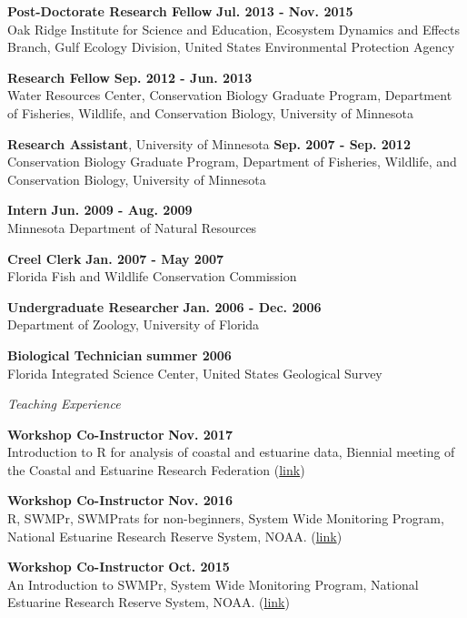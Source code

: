 \documentclass[letterpaper,12pt]{article}
\newcommand{\sectitle}[1]{\vspace{\baselineskip} \centerline{\large{\textit{#1}}}}
\begin{document}
{\bf Post-Doctorate Research Fellow} \hfill {\bf Jul. 2013 - Nov. 2015}\\
Oak Ridge Institute for Science and Education, Ecosystem Dynamics and Effects Branch, Gulf Ecology Division, United States Environmental Protection Agency

{\bf Research Fellow} \hfill {\bf Sep. 2012 - Jun. 2013} \\
Water Resources Center, Conservation Biology Graduate Program, Department of Fisheries, Wildlife, and Conservation Biology, University of Minnesota

{\bf Research Assistant}, University of Minnesota \hfill {\bf Sep. 2007 - Sep. 2012} \\
Conservation Biology Graduate Program, Department of Fisheries, Wildlife, and Conservation Biology, University of Minnesota

{\bf Intern} \hfill {\bf Jun. 2009 - Aug. 2009} \\
Minnesota Department of Natural Resources

{\bf Creel Clerk} \hfill {\bf Jan. 2007 - May 2007} \\
Florida Fish and Wildlife Conservation Commission

{\bf Undergraduate Researcher} \hfill {\bf Jan. 2006 - Dec. 2006} \\
Department of Zoology, University of Florida

{\bf Biological Technician} \hfill {\bf summer 2006} \\
Florida Integrated Science Center, United States Geological Survey

\sectitle{Teaching Experience}

{\bf Workshop Co-Instructor} \hfill {\bf Nov. 2017}\\
Introduction to R for analysis of coastal and estuarine data, Biennial meeting of the Coastal and Estuarine Research Federation (\href{https://usepa.github.io/cerf_r/}{link})

{\bf Workshop Co-Instructor} \hfill {\bf Nov. 2016}\\
R, SWMPr, SWMPrats for non-beginners, System Wide Monitoring Program, National Estuarine Research Reserve System, NOAA. (\href{http://swmprats.net/2016-workshop}{link})

{\bf Workshop Co-Instructor} \hfill {\bf Oct. 2015}\\
An Introduction to SWMPr, System Wide Monitoring Program, National Estuarine Research Reserve System, NOAA. (\href{http://swmprats.net/workshop-2015}{link})
\end{document}
